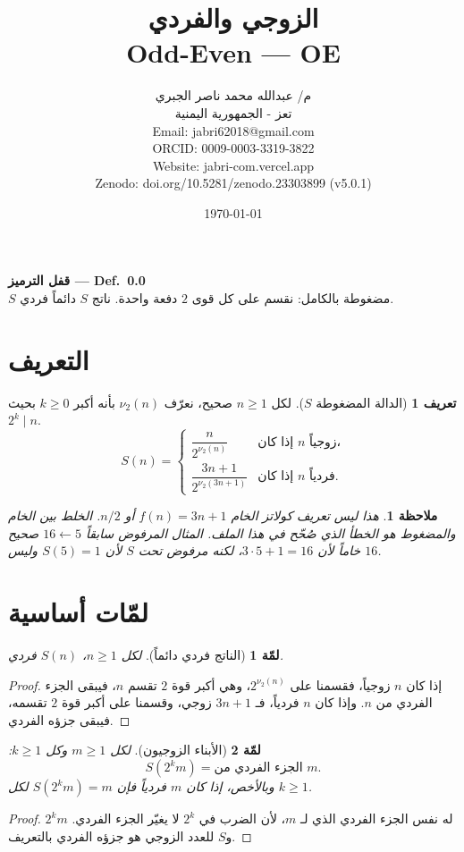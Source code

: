 \documentclass[12pt,a4paper]{article}
\title{الزوجي والفردي \\ \textenglish{Odd-Even --- OE}}
\author{م/ عبدالله محمد ناصر الجبري \\[4pt]
\small تعز - الجمهورية اليمنية \\[2pt]
\small \textenglish{Email: jabri62018@gmail.com} \\[2pt]
\small \textenglish{ORCID: 0009-0003-3319-3822} \\[2pt]
\small \textenglish{Website: jabri-com.vercel.app} \\[2pt]
\small \textenglish{Zenodo: doi.org/10.5281/zenodo.23303899 (v5.0.1)}}
\date{\today}
\theoremstyle{definition}
\newtheorem{definition}{تعريف}[section]
\theoremstyle{plain}
\newtheorem{lemma}{لمّة}[section]
\newtheorem{remark}{ملاحظة}[section]
\newcommand{\nuTwo}{\nu_2}
\newcommand{\compS}{S}
\begin{document}
\maketitle

\begin{center}
\small
\textbf{قفل الترميز --- Def.\ 0.0} \\
$S$ مضغوطة بالكامل: نقسم على كل قوى $2$ دفعة واحدة.
ناتج $S$ دائماً فردي.
\end{center}

\section{التعريف}

\begin{definition}[الدالة المضغوطة $S$]
لكل $n \geq 1$ صحيح، نعرّف $\nuTwo(n)$ بأنه أكبر $k \geq 0$ بحيث $2^k \mid n$.
\[
\compS(n) =
\begin{cases}
\dfrac{n}{2^{\nuTwo(n)}} & \text{إذا كان $n$ زوجياً،} \\[8pt]
\dfrac{3n+1}{2^{\nuTwo(3n+1)}} & \text{إذا كان $n$ فردياً.}
\end{cases}
\]
\end{definition}

\begin{remark}
هذا ليس تعريف كولاتز الخام $f(n)=3n+1$ أو $n/2$.
الخلط بين الخام والمضغوط هو الخطأ الذي صُحّح في هذا الملف.
المثال المرفوض سابقاً $16 \leftarrow 5$ صحيح خاماً لأن $3\cdot 5+1=16$،
لكنه مرفوض تحت $S$ لأن $\compS(5)=1$ وليس $16$.
\end{remark}

\section{لمّات أساسية}

\begin{lemma}[الناتج فردي دائماً]
لكل $n \geq 1$، $\compS(n)$ فردي.
\end{lemma}
\begin{proof}
إذا كان $n$ زوجياً، فقسمنا على $2^{\nuTwo(n)}$، وهي أكبر قوة $2$ تقسم $n$،
فيبقى الجزء الفردي من $n$.
وإذا كان $n$ فردياً، فـ $3n+1$ زوجي، وقسمنا على أكبر قوة $2$ تقسمه،
فيبقى جزؤه الفردي.
\end{proof}

\begin{lemma}[الأبناء الزوجيون]
لكل $m \geq 1$ وكل $k \geq 1$:
\[
\compS(2^k m) = \text{الجزء الفردي من } m.
\]
وبالأخص، إذا كان $m$ فردياً فإن $\compS(2^k m)=m$ لكل $k \geq 1$.
\end{lemma}
\begin{proof}
$2^k m$ له نفس الجزء الفردي الذي لـ $m$، لأن الضرب في $2^k$ لا يغيّر الجزء الفردي.
و$\compS$ للعدد الزوجي هو جزؤه الفردي بالتعريف.
\end{proof}
\end{document}
